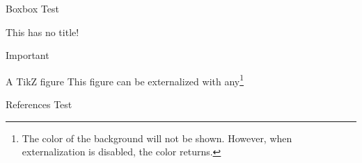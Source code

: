 \documentclass[a3,2col]{ostposter}
\begin{document}
\begin{postercolumn}
	\begin{posterbox}[postergreen]{Boxbox}
		Test
	\end{posterbox}
	\begin{posterbox}{}
		This has no title!
	\end{posterbox}
	\begin{posterbox}[posterpurple]{Important}
		\lipsum[3-4]
	\end{posterbox}
	\begin{posterbox}{A TikZ figure}
		This figure can be externalized with any\footnote{The color of the background will not be shown. However, when externalization is disabled, the color returns.}

	\end{posterbox}
	\begin{posterbox}{References}
		Test
	\end{posterbox}
\end{postercolumn}
\end{document}
